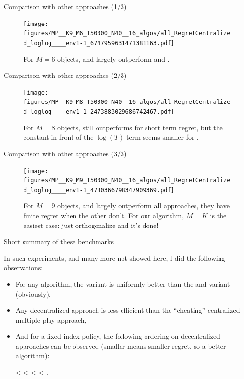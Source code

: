 \documentclass[12pt,english,ignorenonframetext,aspectratio=169,]{beamer}
\providecommand{\tightlist}{%
  \setlength{\itemsep}{0pt}\setlength{\parskip}{0pt}}
\begin{document}
\begin{frame}[plain]{Comparison with other approaches (1/3)}

\begin{figure}[h!]
\centering
\texttt{[image: figures/MP\_\_K9\_M6\_T50000\_N40\_\_16\_algos/all\_RegretCentralized\_loglog\_\_\_\_env1-1\_6747959631471381163.pdf]}
\caption{\footnotesize{For $M=6$ objects, \MCTopM{} and \RandTopM{} largely outperform \SICMMAB{} and \rhoRand.}}
\end{figure}

\end{frame}


\begin{frame}[plain]{Comparison with other approaches (2/3)}

\begin{figure}[h!]
\centering
\texttt{[image: figures/MP\_\_K9\_M8\_T50000\_N40\_\_16\_algos/all\_RegretCentralized\_loglog\_\_\_\_env1-1\_2473883029686742467.pdf]}
\caption{\footnotesize{For $M=8$ objects, \MCTopM{} still outperforms \SICMMAB{} for short term regret, but the constant in front of the $\log(T)$ term seems smaller for \SICMMAB.}}
\end{figure}

\end{frame}


\begin{frame}[plain]{Comparison with other approaches (3/3)}

\begin{figure}[h!]
\centering
\texttt{[image: figures/MP\_\_K9\_M9\_T50000\_N40\_\_16\_algos/all\_RegretCentralized\_loglog\_\_\_\_env1-1\_4780366798347909369.pdf]}
\caption{\footnotesize{For $M=9$ objects, \MCTopM{} and \RandTopM{} largely outperform all approaches, they have finite regret when the other don't. For our algorithm, $M=K$ is the easiest case: just orthogonalize and it's done!}}
\end{figure}

\end{frame}


\begin{frame}{Short summary of these benchmarks}

In such experiments, and many more not showed here, I did the following observations:

\begin{itemize}\tightlist
  \item For any algorithm, the \klUCB{} variant is uniformly better than the \UCB{} and \UCBH variant (obviously),
  \item Any decentralized approach is less efficient than the ``cheating'' centralized multiple-play approach,
  \item And for a fixed index policy, the following ordering on decentralized approaches can be observed (smaller means smaller regret, so a better algorithm):
  \begin{center}
    \MCTopM{} < \RandTopM{} < \SICMMAB{} < \Selfish{} < \rhoRand.
  \end{center}
\end{itemize}

\end{frame}
\end{document}
